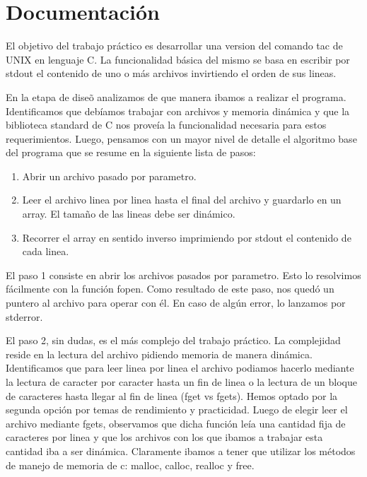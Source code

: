 \documentclass[a4paper,11pt]{article}
\begin{document}
\section{Documentaci\'on}
El objetivo del trabajo pr\'actico es desarrollar una version del comando tac de UNIX en lenguaje C. La funcionalidad b\'asica del mismo se basa en escribir por stdout el contenido de uno o m\'as archivos invirtiendo el orden de sus lineas.

En la etapa de dise\~o analizamos de que manera ibamos a realizar el programa. Identificamos que deb\'iamos trabajar con archivos y memoria din\'amica y que la biblioteca standard de C nos prove\'ia la funcionalidad necesaria para estos requerimientos. Luego, pensamos con un mayor nivel de detalle el algoritmo base del programa que se resume en la siguiente lista de pasos:
\begin{enumerate}
	\item Abrir un archivo pasado por parametro.
	\item Leer el archivo linea por linea hasta el final del archivo y guardarlo en un array. El tama\~no de las lineas debe ser din\'amico.
	\item Recorrer el array en sentido inverso imprimiendo por stdout el contenido de cada linea.
\end{enumerate}

El paso 1 consiste en abrir los archivos pasados por parametro. Esto lo resolvimos f\'acilmente con la funci\'on fopen. Como resultado de este paso, nos qued\'o un puntero al archivo para operar con \'el. En caso de alg\'un error, lo lanzamos por stderror.

El paso 2, sin dudas, es el m\'as complejo del trabajo pr\'actico. La complejidad reside en la lectura del archivo pidiendo memoria de manera din\'amica. 
Identificamos que para leer linea por linea el archivo podiamos hacerlo mediante la lectura de caracter por caracter hasta un fin de linea o la lectura de un bloque de caracteres hasta llegar al fin de linea (fget vs fgets). Hemos optado por la segunda opci\'on por temas de rendimiento y practicidad.
Luego de elegir leer el archivo mediante fgets, observamos que dicha funci\'on le\'ia una cantidad fija de caracteres por linea y que los archivos con los que ibamos a trabajar esta cantidad iba a ser din\'amica. Claramente ibamos a tener que utilizar los m\'etodos de manejo de memoria de c: malloc, calloc, realloc y free.
\end{document}

